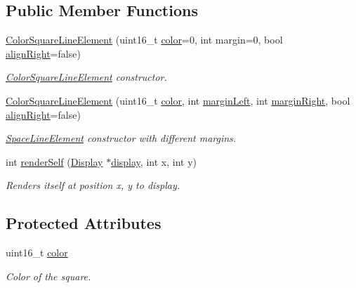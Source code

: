 \subsection*{Public Member Functions}
\begin{DoxyCompactItemize}
\item 
\mbox{\hyperlink{classScreen_1_1ColorSquareLineElement_a7b2a8f8271e09229ad5e3809b1baaf59}{Color\+Square\+Line\+Element}} (uint16\+\_\+t \mbox{\hyperlink{classScreen_1_1ColorSquareLineElement_a8ebfc246a4c52a6f6a82c318511468d6}{color}}=0, int margin=0, bool \mbox{\hyperlink{classScreen_1_1LineElement_a0c5f4e33c2df1dce8e4e45b90dac1423}{align\+Right}}=false)
\begin{DoxyCompactList}\small\item\em \mbox{\hyperlink{classScreen_1_1ColorSquareLineElement}{Color\+Square\+Line\+Element}} constructor. \end{DoxyCompactList}\item 
\mbox{\hyperlink{classScreen_1_1ColorSquareLineElement_a4a07bd81e804bea2dce0a585cd93ef54}{Color\+Square\+Line\+Element}} (uint16\+\_\+t \mbox{\hyperlink{classScreen_1_1ColorSquareLineElement_a8ebfc246a4c52a6f6a82c318511468d6}{color}}, int \mbox{\hyperlink{classScreen_1_1LineElement_a9ed23f9510a11334af9be6f53965f7a6}{margin\+Left}}, int \mbox{\hyperlink{classScreen_1_1LineElement_a3a2077f01072be8e8fd0f4539b85beb0}{margin\+Right}}, bool \mbox{\hyperlink{classScreen_1_1LineElement_a0c5f4e33c2df1dce8e4e45b90dac1423}{align\+Right}}=false)
\begin{DoxyCompactList}\small\item\em \mbox{\hyperlink{classScreen_1_1SpaceLineElement}{Space\+Line\+Element}} constructor with different margins. \end{DoxyCompactList}\item 
int \mbox{\hyperlink{classScreen_1_1ColorSquareLineElement_abea938100788da99f8ded53ca642edc0}{render\+Self}} (\mbox{\hyperlink{classDisplay}{Display}} $\ast$\mbox{\hyperlink{classScreen_aad713267725e8aa8a8def951a07de641}{display}}, int x, int y)
\begin{DoxyCompactList}\small\item\em Renders itself at position x, y to display. \end{DoxyCompactList}\end{DoxyCompactItemize}
\subsection*{Protected Attributes}
\begin{DoxyCompactItemize}
\item 
\mbox{\label{classScreen_1_1ColorSquareLineElement_a8ebfc246a4c52a6f6a82c318511468d6}} 
uint16\+\_\+t \mbox{\hyperlink{classScreen_1_1ColorSquareLineElement_a8ebfc246a4c52a6f6a82c318511468d6}{color}}
\begin{DoxyCompactList}\small\item\em Color of the square. \end{DoxyCompactList}\end{DoxyCompactItemize}
